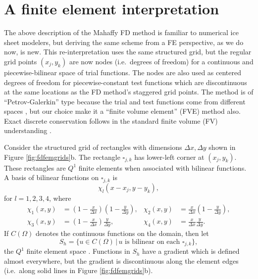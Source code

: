 \documentclass[11pt]{amsart}
\begin{document}
\section{A finite element interpretation}

The above description of the Mahaffy FD method is familiar to numerical ice sheet modelers, but deriving the same scheme from a FE perspective, as we do now, is new.  This re-interpretation uses the same structured grid, but the regular grid points $(x_j,y_k)$ are now nodes (i.e.~degrees of freedom) for a continuous and piecewise-bilinear space of trial functions.  The nodes are also used as centered degrees of freedom for piecewise-constant test functions which are discontinuous at the same locations as the FD method's staggered grid points.  The method is of ``Petrov-Galerkin'' type because the trial and test functions come from different spaces \cite{Elmanetal2005}, but our choice make it a ``finite volume element'' (FVE) method \cite{EwingLinLin2002} also.  Exact discrete conservation follows in the standard finite volume (FV) understanding \cite{LeVeque}.

Consider the structured grid of rectangles with dimensions $\Delta x,\Delta y$ shown in Figure \ref{fig:fdfemgrids}b.  The rectangle $\square_{j,k}$ has lower-left corner at $(x_j,y_k)$.  These rectangles are $Q^1$ finite elements when associated with bilinear functions.  A basis of bilinear functions on $\square_{j,k}$ is
\begin{equation}
\chi_l(x-x_j,y-y_k), \label{eq:elementbasis}
\end{equation}
for $l=1,2,3,4$, where
\begin{align*}
\chi_1(x,y) &= \left(1-\tfrac{x}{\Delta x}\right) \left(1-\tfrac{y}{\Delta y}\right), & \chi_2(x,y) &= \tfrac{x}{\Delta x} \left(1-\tfrac{y}{\Delta y}\right), \\
\chi_3(x,y) &= \left(1-\tfrac{x}{\Delta x}\right) \tfrac{y}{\Delta y}, & \chi_4(x,y) &= \tfrac{x}{\Delta x} \tfrac{y}{\Delta y}. 
\end{align*}
If $C(\Omega)$ denotes the continuous functions on the domain, then let
\begin{equation}
S_h = \{u \in C(\Omega) \,\big|\, u \text{ is bilinear on each $\square_{j,k}$}\},
\end{equation}
the $Q^1$ finite element space \cite{Elmanetal2005}.  Functions in $S_h$ have a gradient which is defined almost everywhere, but the gradient is discontinuous along the element edges (i.e.~along solid lines in Figure \ref{fig:fdfemgrids}b).
\end{document}
